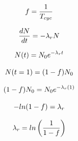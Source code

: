 \begin{equation} \hfill
f = \frac{1}{T_{cyc}}
\hfill\label{eq:nat_log_0} \end{equation}

\begin{equation} \hfill
\frac{dN}{dt} = -\lambda_r N
\hfill\label{eq:nat_log_1} \end{equation}

\begin{equation} \hfill
N(t) = N_0 e^{-\lambda_r t}
\hfill\label{eq:nat_log_1_half} \end{equation}

\begin{equation} \hfill
N(t = 1) = (1-f) N_{0}
\hfill\label{eq:nat_log_2} \end{equation}

\begin{equation} \hfill
(1-f) N_{0} = N_{0} e^{-\lambda_r (1)}
\hfill\label{eq:nat_log_2_1} \end{equation}

\begin{equation} \hfill
-ln(1-f)  = \lambda_r
\hfill\label{eq:nat_log_2_5} \end{equation}

\begin{equation} \hfill
\lambda_r = ln\left( \frac{1}{1-f} \right)
\hfill\label{eq:nat_log_3} \end{equation}




